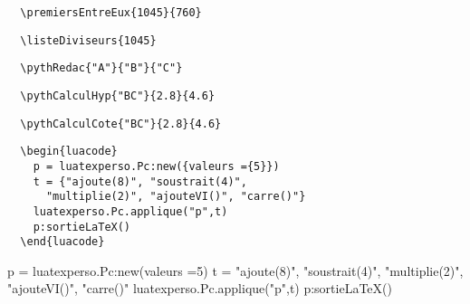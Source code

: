 \documentclass{article}
\begin{document}
\begin{multicols}{3}
\medskip
\begin{Verbatim}
  \premiersEntreEux{1045}{760}
\end{Verbatim}
\begin{minipage}{\linewidth}
\end{minipage}

\medskip
\begin{Verbatim}
  \listeDiviseurs{1045}
\end{Verbatim}
\begin{minipage}{\linewidth}
\end{minipage}

\medskip
\begin{Verbatim}
  \pythRedac{"A"}{"B"}{"C"}
\end{Verbatim}
\begin{minipage}{\linewidth}
\end{minipage}

\medskip
\begin{Verbatim}
  \pythCalculHyp{"BC"}{2.8}{4.6}
\end{Verbatim}
\begin{minipage}{\linewidth} 
\end{minipage}

\medskip
\begin{Verbatim}
  \pythCalculCote{"BC"}{2.8}{4.6}
\end{Verbatim}
\begin{minipage}{\linewidth}
\end{minipage}

\medskip
\begin{Verbatim}
  \begin{luacode}
    p = luatexperso.Pc:new({valeurs ={5}})
    t = {"ajoute(8)", "soustrait(4)",
      "multiplie(2)", "ajouteVI()", "carre()"}
    luatexperso.Pc.applique("p",t)
    p:sortieLaTeX()
  \end{luacode}
\end{Verbatim}
\begin{minipage}{\linewidth}
\begin{luacode}
    p = luatexperso.Pc:new({valeurs ={5}})
    t = {"ajoute(8)", "soustrait(4)", "multiplie(2)", "ajouteVI()", "carre()"}
    luatexperso.Pc.applique("p",t)
    p:sortieLaTeX()
  \end{luacode}
\end{minipage}


\end{multicols}
\end{document}
